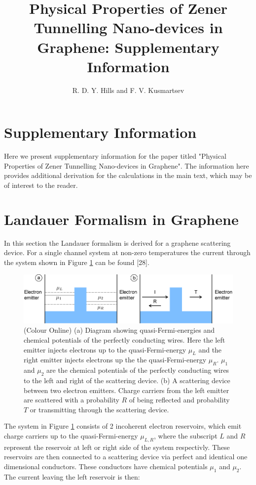 \documentclass[12pt,a4paper]{article}
\title{Physical Properties of Zener Tunnelling Nano-devices in Graphene: Supplementary Information}
\author{R. D. Y. Hills and F. V. Kusmartsev}
\begin{document}
\maketitle
	\section{Supplementary Information}
	Here we present supplementary information for the paper titled "Physical Properties of Zener Tunnelling Nano-devices in Graphene". The information here provides additional derivation for the calculations in the main text, which may be of interest to the reader.
		\section{Landauer Formalism in Graphene}
			In this section the Landauer formalism is derived for a graphene scattering device. For a single channel system at non-zero temperatures the current through the system shown in Figure \ref{introduction-current} can be found [28].
			\begin{figure}[h]
				\centerline{\includegraphics[scale=0.5]{current}}
				\caption{(Colour Online) (a) Diagram showing quasi-Fermi-energies and chemical potentials of the perfectly conducting wires. Here the left emitter injects electrons up to the quasi-Fermi-energy $\mu_{L}$ and the right emitter injects electrons up the the quasi-Fermi-energy $\mu_{R}$. $\mu_{1}$ and $\mu_{2}$ are the chemical potentials of the perfectly conducting wires to the left and right of the scattering device. (b) A scattering device between two electron emitters. Charge carriers from the left emitter are scattered with a probability $R$ of being reflected and probability $T$ or transmitting through the scattering device.}
				\label{introduction-current}
			\end{figure}
			 The system in Figure \ref{introduction-current} consists of 2 incoherent electron reservoirs, which emit charge carriers up to the quasi-Fermi-energy $\mu_{L,R}$, where the subscript $L$ and $R$ represent the reservoir at left or right side of the system respectivly. These reservoirs are then connected to a scattering device via perfect and identical one dimensional conductors. These conductors have chemical potentials $\mu_{1}$ and $\mu_{2}$. The current leaving the left reservoir is then:
\end{document}
